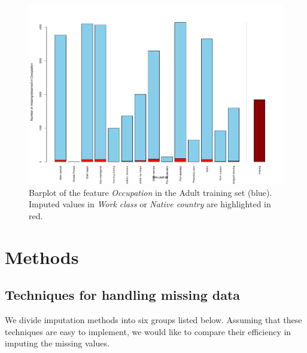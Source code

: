 \documentclass[12pt]{article}
\begin{document}
\begin{figure}[htbp] 
   \centering
   \includegraphics[scale=0.6]{barplot-occ-missing.pdf} 
   \caption{Barplot of the feature \textit{Occupation} in the Adult training set (blue). Imputed values in \textit{Work class} or \textit{Native country} are highlighted in red.}
   \label{barplot-occ-missing}
\end{figure}

\section{Methods}


\subsection{Techniques for handling missing data}
We divide imputation methods into six groups listed
below\cite{batista2003analysis}. Assuming that these techniques are easy to
implement, we would like to compare their efficiency in imputing the missing
values.
\end{document}
